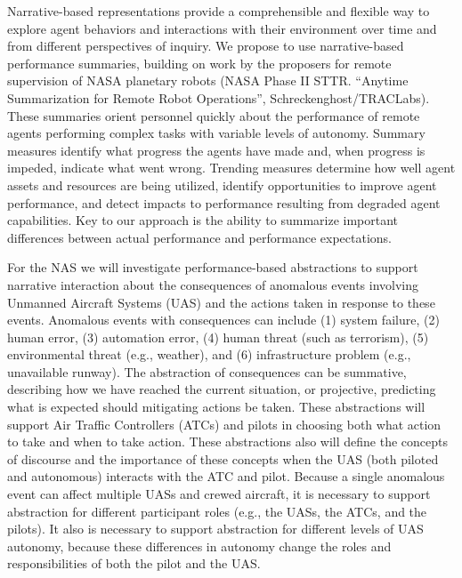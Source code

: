 Narrative-based representations provide a comprehensible and flexible
way to explore agent behaviors and interactions with their environment
over time and from different perspectives of inquiry. We propose to
use narrative-based performance summaries, building on work by the
proposers for remote supervision of NASA planetary robots (NASA Phase
II STTR. “Anytime Summarization for Remote Robot Operations”,
Schreckenghost/TRACLabs). These summaries orient personnel quickly
about the performance of remote agents performing complex tasks with
variable levels of autonomy. Summary measures identify what progress
the agents have made and, when progress is impeded, indicate what went
wrong. Trending measures determine how well agent assets and resources
are being utilized, identify opportunities to improve agent
performance, and detect impacts to performance resulting from degraded
agent capabilities. Key to our approach is the ability to summarize
important differences between actual performance and performance
expectations.

For the NAS we will investigate performance-based abstractions to
support narrative interaction about the consequences of anomalous
events involving Unmanned Aircraft Systems (UAS) and the actions taken
in response to these events. Anomalous events with consequences can
include (1) system failure, (2) human error, (3) automation error, (4)
human threat (such as terrorism), (5) environmental threat (e.g.,
weather), and (6) infrastructure problem (e.g., unavailable
runway). The abstraction of consequences can be summative, describing
how we have reached the current situation, or projective, predicting
what is expected should mitigating actions be taken. These
abstractions will support Air Traffic Controllers (ATCs) and pilots in
choosing both what action to take and when to take action. These
abstractions also will define the concepts of discourse and the
importance of these concepts when the UAS (both piloted and
autonomous) interacts with the ATC and pilot. Because a single
anomalous event can affect multiple UASs and crewed aircraft, it is
necessary to support abstraction for different participant roles
(e.g., the UASs, the ATCs, and the pilots). It also is necessary to
support abstraction for different levels of UAS autonomy, because
these differences in autonomy change the roles and responsibilities of
both the pilot and the UAS.

